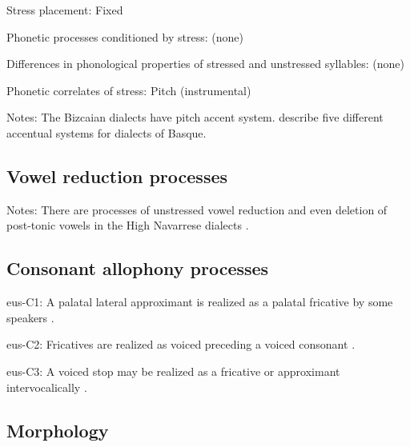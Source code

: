 {\begin{appendixdesc}
\item[Stress placement:] Fixed

\item[Phonetic processes conditioned by stress:] (none)

\item[Differences in phonological properties of stressed and unstressed syllables:] (none)

\item[Phonetic correlates of stress:] Pitch (instrumental)

\item[Notes:] The Bizcaian dialects have pitch accent system. \citet[282--283]{SaltarelliEtAl1988} describe five different accentual systems for dialects of Basque.
\end{appendixdesc}
\subsection*{Vowel reduction processes}
\begin{appendixdesc}

\item[Notes:] There are processes of unstressed vowel reduction and even deletion of post-tonic vowels in the High Navarrese dialects \citep[56--57]{Hualde2003}.
\end{appendixdesc}
\subsection*{Consonant allophony processes}
\begin{appendixdesc}

\item[eus-C1:] A palatal lateral approximant is realized as a palatal fricative by some speakers \citep[29]{Hualde2003}.

\item[eus-C2:] Fricatives are realized as voiced preceding a voiced consonant \citep[24]{Hualde2003}.

\item[eus-C3:] A voiced stop may be realized as a fricative or approximant intervocalically \citep[19]{Hualde2003}.
\end{appendixdesc}
\subsection*{Morphology}

\begin{appendixdesc}


\end{appendixdesc}}
